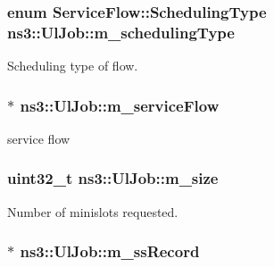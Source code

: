 \subsubsection[{\texorpdfstring{m\+\_\+scheduling\+Type}{m_schedulingType}}]{\setlength{\rightskip}{0pt plus 5cm}enum {\bf Service\+Flow\+::\+Scheduling\+Type} ns3\+::\+Ul\+Job\+::m\+\_\+scheduling\+Type\hspace{0.3cm}{\ttfamily [private]}}\hypertarget{classns3_1_1UlJob_ac6c4056f20e80313a84f032ba5bee253}{}\label{classns3_1_1UlJob_ac6c4056f20e80313a84f032ba5bee253}


Scheduling type of flow. 

\subsubsection[{\texorpdfstring{m\+\_\+service\+Flow}{m_serviceFlow}}]{$\ast$ ns3\+::\+Ul\+Job\+::m\+\_\+service\+Flow\hspace{0.3cm}{\ttfamily [private]}}\hypertarget{classns3_1_1UlJob_a38d65f8d1bcf722569fc792e1ba6bb13}{}\label{classns3_1_1UlJob_a38d65f8d1bcf722569fc792e1ba6bb13}


service flow 

\subsubsection[{\texorpdfstring{m\+\_\+size}{m_size}}]{\setlength{\rightskip}{0pt plus 5cm}uint32\+\_\+t ns3\+::\+Ul\+Job\+::m\+\_\+size\hspace{0.3cm}{\ttfamily [private]}}\hypertarget{classns3_1_1UlJob_a78d32b4939d1ecf587400c8e7537c984}{}\label{classns3_1_1UlJob_a78d32b4939d1ecf587400c8e7537c984}


Number of minislots requested. 

\subsubsection[{\texorpdfstring{m\+\_\+ss\+Record}{m_ssRecord}}]{$\ast$ ns3\+::\+Ul\+Job\+::m\+\_\+ss\+Record\hspace{0.3cm}{\ttfamily [private]}}\hypertarget{classns3_1_1UlJob_a745230608fea13ba37e7201ef1d4671f}{}\label{classns3_1_1UlJob_a745230608fea13ba37e7201ef1d4671f}


